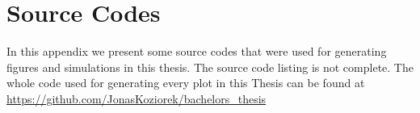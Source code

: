 \chapter{Source Codes}
\label{sec:Appendix_codes}

In this appendix we present some source codes that were used for generating figures and simulations in this thesis.
The source code listing is not complete.
The whole code used for generating every plot in this Thesis can be found at \url{https://github.com/JonasKoziorek/bachelors_thesis}






\endinput